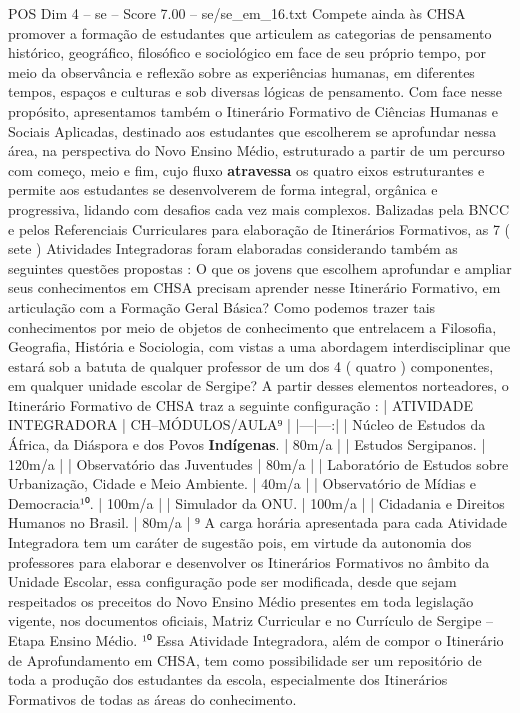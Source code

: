 \begin{textsample}{POS Dim 4 – se – Score 7.00 – se/se\_em\_16.txt}
Compete ainda às CHSA promover a formação de estudantes que articulem as categorias de pensamento histórico, geográfico, filosófico e sociológico em face de seu próprio tempo, por meio da observância e reflexão sobre as experiências humanas, em diferentes tempos, espaços e culturas e sob diversas lógicas de pensamento.
Com face nesse propósito, apresentamos também o Itinerário Formativo de Ciências Humanas e Sociais Aplicadas, destinado aos estudantes que escolherem se aprofundar nessa área, na perspectiva do Novo Ensino Médio, estruturado a partir de um percurso com começo, meio e fim, cujo fluxo \textbf{atravessa} os quatro eixos estruturantes e permite aos estudantes se desenvolverem de forma integral, orgânica e progressiva, lidando com desafios cada vez mais complexos.
Balizadas pela BNCC e pelos Referenciais Curriculares para elaboração de Itinerários Formativos, as 7 ( sete ) Atividades Integradoras foram elaboradas considerando também as seguintes questões propostas : O que os jovens que escolhem aprofundar e ampliar seus conhecimentos em CHSA precisam aprender nesse Itinerário Formativo, em articulação com a Formação Geral Básica?
Como podemos trazer tais conhecimentos por meio de objetos de conhecimento que entrelacem a Filosofia, Geografia, História e Sociologia, com vistas a uma abordagem interdisciplinar que estará sob a batuta de qualquer professor de um dos 4 ( quatro ) componentes, em qualquer unidade escolar de Sergipe?
A partir desses elementos norteadores, o Itinerário Formativo de CHSA traz a seguinte configuração : | ATIVIDADE INTEGRADORA | CH–MÓDULOS/AULA⁹ | |---|---:| | Núcleo de Estudos da África, da Diáspora e dos Povos \textbf{Indígenas}. | 80m/a | | Estudos Sergipanos. | 120m/a | | Observatório das Juventudes | 80m/a | | Laboratório de Estudos sobre Urbanização, Cidade e Meio Ambiente. | 40m/a | | Observatório de Mídias e Democracia¹⁰. | 100m/a | | Simulador da ONU. | 100m/a | | Cidadania e Direitos Humanos no Brasil. | 80m/a | ⁹ A carga horária apresentada para cada Atividade Integradora tem um caráter de sugestão pois, em virtude da autonomia dos professores para elaborar e desenvolver os Itinerários Formativos no âmbito da Unidade Escolar, essa configuração pode ser modificada, desde que sejam respeitados os preceitos do Novo Ensino Médio presentes em toda legislação vigente, nos documentos oficiais, Matriz Curricular e no Currículo de Sergipe – Etapa Ensino Médio. ¹⁰ Essa Atividade Integradora, além de compor o Itinerário de Aprofundamento em CHSA, tem como possibilidade ser um repositório de toda a produção dos estudantes da escola, especialmente dos Itinerários Formativos de todas as áreas do conhecimento.

\end{textsample}
